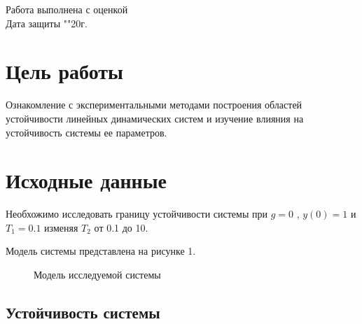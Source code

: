 \documentclass[a4paper, 11pt]{article}
\begin{document}
\begin{titlepage}
		Работа выполнена с оценкой \hspace{0.5cm} \underline{\hspace{10cm}} \\ 
		\vspace{1cm}
		Дата защиты "\underline{\hspace{0.4cm}}"\hspace{0.1cm}\underline{\hspace{1.5cm}}\hspace{0.1cm}20\underline{\hspace{0.4cm}}г.
		
	\end{titlepage}

	\section*{Цель работы}\hfill\par
	Ознакомление с экспериментальными методами построения областей устойчивости линейных динамических систем и изучение влияния на устойчивость системы ее параметров.
	\section*{Исходные данные}\hfill\par
	Необхожимо исследовать границу устойчивости системы при $g = 0$ , $y(0) = 1$ и $T_1=0.1$ изменяя $T_2$ от 0.1 до 10. \par
	Модель системы представлена на рисунке 1.
	\begin{figure}[h!]
		\caption{Модель исследуемой системы}
		\label{one}
	\end{figure}
	\newpage
	
	\begin{center}
		\section{Устойчивость системы}
	\end{center}
\end{document}
